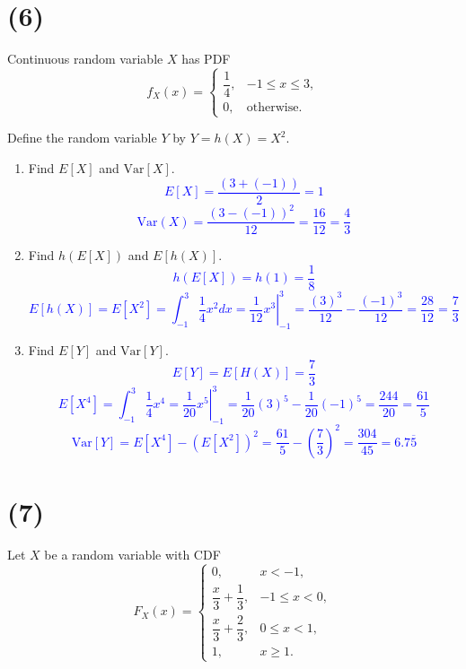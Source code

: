 \documentclass[12pt]{article}
\begin{document}
\section*{(6)} Continuous random variable $X$ has PDF
    \[
    f_X(x) =
    \begin{cases}
    \dfrac{1}{4}, & -1 \leq x \leq 3, \\
    0, & \text{otherwise}.
    \end{cases}
    \]

Define the random variable $Y$ by $Y = h(X) = X^2$.
    \begin{enumerate}
        \item[(a)] Find $E[X]$ and $\text{Var}[X]$.
            \textcolor{blue}{\[E[X]=\frac{(3+(-1))}{2}=\boxed{1}\]
            \[\text{Var}(X)=\frac{(3-(-1))^2}{12}=\frac{16}{12}=\boxed{\frac{4}{3}}\]}
        \item[(b)] Find $h(E[X])$ and $E[h(X)]$.
            \textcolor{blue}{\[h(E[X])=h(1)=\boxed{\frac{1}{8}}\]
            \[E[h(X)]=E[X^2]=\int_{-1}^{3}{\frac{1}{4}}x^2dx=\left.\frac{1}{12}x^3\right\rvert_{-1}^3=\frac{(3)^3}{12}-\frac{(-1)^3}{12}=\frac{28}{12}=\boxed{\frac{7}{3}}\]}
        \item[(c)] Find $E[Y]$ and $\text{Var}[Y]$.
            \textcolor{blue}{\[E[Y]=E[H(X)]=\boxed{\frac{7}{3}}\]}
            \textcolor{blue}{\[E[X^4]=\int_{-1}^{3}{\frac{1}{4}x^4}=\left.\frac{1}{20}x^5\right\rvert_{-1}^3=\frac{1}{20}(3)^5-\frac{1}{20}(-1)^5=\frac{244}{20}=\frac{61}{5}\]}
            \textcolor{blue}{\[\text{Var}[Y]=E[X^4]-(E[X^2])^2=\frac{61}{5}-\left(\frac{7}{3}\right)^2=\frac{304}{45}=\boxed{6.7\overline{5}}\]}
    \end{enumerate}
\newpage 

\section*{(7)} Let $X$ be a random variable with CDF
    \[
    F_X(x) =
    \begin{cases}
    0, & x < -1, \\
    \dfrac{x}{3} + \dfrac{1}{3}, & -1 \leq x < 0, \\
    \dfrac{x}{3} + \dfrac{2}{3}, & 0 \leq x < 1, \\
    1, & x \geq 1.
    \end{cases}
    \]
\end{document}
